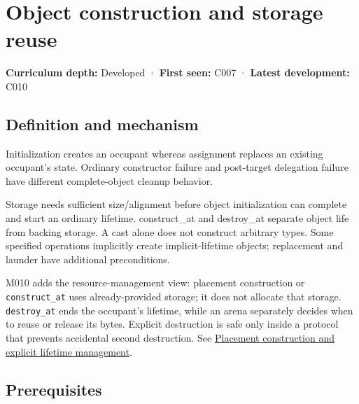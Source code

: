 \hypertarget{appendix-a82f9c438857}{}\label{referencestart:appendix-a82f9c438857}
\section{Object construction and storage reuse}\label{appendix-a82f9c438857-object-construction-and-storage-reuse}

\hypertarget{appendix-a82f9c438857-object-construction-and-storage-reuse}{}

\textbf{Curriculum depth:} Developed · \textbf{First seen:} C007 · \textbf{Latest development:} C010

\begin{allmightroledefinition}

\subsection{Definition and mechanism}\label{appendix-a82f9c438857-definition-and-mechanism}

\hypertarget{appendix-a82f9c438857-definition-and-mechanism}{}

Initialization creates an occupant whereas assignment replaces an existing occupant's state. Ordinary constructor failure and post-target delegation failure have different complete-object cleanup behavior.

\end{allmightroledefinition}

Storage needs sufficient size/alignment before object initialization can complete and start an ordinary lifetime. construct\_at and destroy\_at separate object life from backing storage. A cast alone does not construct arbitrary types. Some specified operations implicitly create implicit-lifetime objects; replacement and launder have additional preconditions.

M010 adds the resource-management view: placement construction or \texttt{construct\_at} uses already-provided storage; it does not allocate that storage. \texttt{destroy\_at} ends the occupant's lifetime, while an arena separately decides when to reuse or release its bytes. Explicit destruction is safe only inside a protocol that prevents accidental second destruction. See \hyperref[appendix-f56c3e43fd4e]{Placement construction and explicit lifetime management}.

\subsection{Prerequisites}\label{appendix-a82f9c438857-prerequisites}

